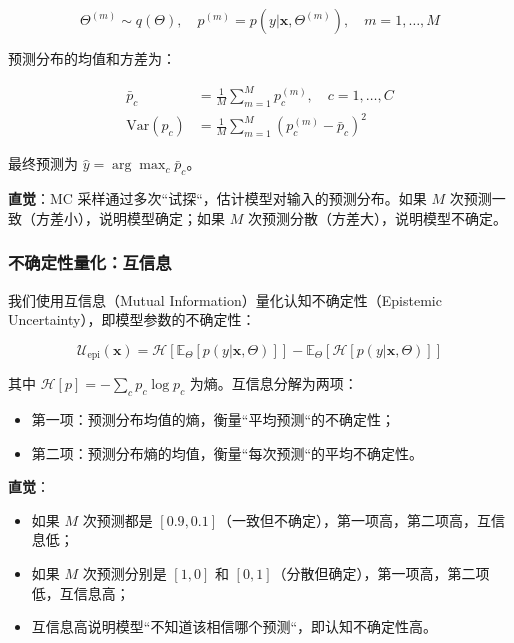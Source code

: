 \begin{equation}
\Theta^{(m)} \sim q(\Theta), \quad p^{(m)} = p(y | \mathbf{x}, \Theta^{(m)}), \quad m=1,\ldots,M
\end{equation}

预测分布的均值和方差为：

\begin{align}
\bar{p}_c &= \frac{1}{M} \sum_{m=1}^M p_c^{(m)}, \quad c=1,\ldots,C \\
\text{Var}(p_c) &= \frac{1}{M} \sum_{m=1}^M (p_c^{(m)} - \bar{p}_c)^2
\end{align}

最终预测为 $\hat{y} = \arg\max_c \bar{p}_c$。

\textbf{直觉}：MC 采样通过多次``试探``，估计模型对输入的预测分布。如果 $M$ 次预测一致（方差小），说明模型确定；如果 $M$ 次预测分散（方差大），说明模型不确定。

\subsubsection{不确定性量化：互信息}

我们使用互信息（Mutual Information）量化认知不确定性（Epistemic Uncertainty），即模型参数的不确定性：

\begin{equation}
\mathcal{U}_{\text{epi}}(\mathbf{x}) = \mathcal{H}\left[\mathbb{E}_{\Theta}[p(y|\mathbf{x},\Theta)]\right] - \mathbb{E}_{\Theta}\left[\mathcal{H}[p(y|\mathbf{x},\Theta)]\right]
\end{equation}

其中 $\mathcal{H}[p] = -\sum_c p_c \log p_c$ 为熵。互信息分解为两项：
\begin{itemize}
  \item 第一项：预测分布均值的熵，衡量``平均预测``的不确定性；
  \item 第二项：预测分布熵的均值，衡量``每次预测``的平均不确定性。
\end{itemize}

\textbf{直觉}：
\begin{itemize}
  \item 如果 $M$ 次预测都是 $[0.9, 0.1]$（一致但不确定），第一项高，第二项高，互信息低；
  \item 如果 $M$ 次预测分别是 $[1, 0]$ 和 $[0, 1]$（分散但确定），第一项高，第二项低，互信息高；
  \item 互信息高说明模型``不知道该相信哪个预测``，即认知不确定性高。
\end{itemize}


